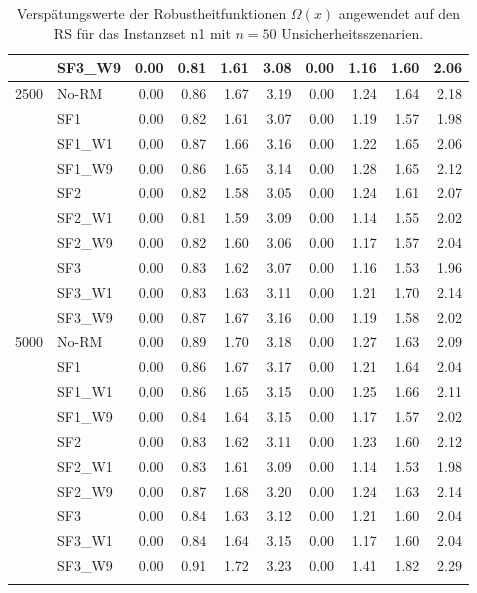 {\begin{longtable}{ll|rrrr|rrrr}
     & SF3\_W9 & 0.00 & 0.81 & 1.61 & 3.08 & 0.00 & 1.16 & 1.60 & 2.06 \\ \hline
2500 & No-RM & 0.00 & 0.86 & 1.67 & 3.19 & 0.00 & 1.24 & 1.64 & 2.18 \\
     & SF1 & 0.00 & 0.82 & 1.61 & 3.07 & 0.00 & 1.19 & 1.57 & 1.98 \\
     & SF1\_W1 & 0.00 & 0.87 & 1.66 & 3.16 & 0.00 & 1.22 & 1.65 & 2.06 \\
     & SF1\_W9 & 0.00 & 0.86 & 1.65 & 3.14 & 0.00 & 1.28 & 1.65 & 2.12 \\
     & SF2 & 0.00 & 0.82 & 1.58 & 3.05 & 0.00 & 1.24 & 1.61 & 2.07 \\
     & SF2\_W1 & 0.00 & 0.81 & 1.59 & 3.09 & 0.00 & 1.14 & 1.55 & 2.02 \\
     & SF2\_W9 & 0.00 & 0.82 & 1.60 & 3.06 & 0.00 & 1.17 & 1.57 & 2.04 \\
     & SF3 & 0.00 & 0.83 & 1.62 & 3.07 & 0.00 & 1.16 & 1.53 & 1.96 \\
     & SF3\_W1 & 0.00 & 0.83 & 1.63 & 3.11 & 0.00 & 1.21 & 1.70 & 2.14 \\
     & SF3\_W9 & 0.00 & 0.87 & 1.67 & 3.16 & 0.00 & 1.19 & 1.58 & 2.02 \\ \hline
5000 & No-RM & 0.00 & 0.89 & 1.70 & 3.18 & 0.00 & 1.27 & 1.63 & 2.09 \\
     & SF1 & 0.00 & 0.86 & 1.67 & 3.17 & 0.00 & 1.21 & 1.64 & 2.04 \\
     & SF1\_W1 & 0.00 & 0.86 & 1.65 & 3.15 & 0.00 & 1.25 & 1.66 & 2.11 \\
     & SF1\_W9 & 0.00 & 0.84 & 1.64 & 3.15 & 0.00 & 1.17 & 1.57 & 2.02 \\
     & SF2 & 0.00 & 0.83 & 1.62 & 3.11 & 0.00 & 1.23 & 1.60 & 2.12 \\
     & SF2\_W1 & 0.00 & 0.83 & 1.61 & 3.09 & 0.00 & 1.14 & 1.53 & 1.98 \\
     & SF2\_W9 & 0.00 & 0.87 & 1.68 & 3.20 & 0.00 & 1.24 & 1.63 & 2.14 \\
     & SF3 & 0.00 & 0.84 & 1.63 & 3.12 & 0.00 & 1.21 & 1.60 & 2.04 \\
     & SF3\_W1 & 0.00 & 0.84 & 1.64 & 3.15 & 0.00 & 1.17 & 1.60 & 2.04 \\
     & SF3\_W9 & 0.00 & 0.91 & 1.72 & 3.23 & 0.00 & 1.41 & 1.82 & 2.29 \\
\bottomrule
\caption{Verspätungswerte der Robustheitfunktionen $\Omega(x)$ angewendet auf den \acs{RS} für das Instanzset n1 mit $n = 50$ Unsicherheitsszenarien. }
\label{tab:evaluation_robustness_n1_ra}
\end{longtable}
}
\vspace*{-25px}
\begin{figure}[H]
\end{figure}

